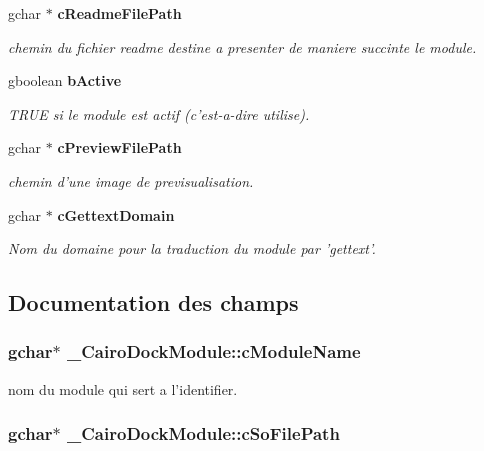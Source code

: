 \begin{CompactItemize}
gchar $\ast$ {\bf cReadmeFilePath}
\begin{CompactList}\small\item\em chemin du fichier readme destine a presenter de maniere succinte le module. \item\end{CompactList}\item 
gboolean {\bf bActive}
\begin{CompactList}\small\item\em TRUE si le module est actif (c'est-a-dire utilise). \item\end{CompactList}\item 
gchar $\ast$ {\bf cPreviewFilePath}
\begin{CompactList}\small\item\em chemin d'une image de previsualisation. \item\end{CompactList}\item 
gchar $\ast$ {\bf cGettextDomain}
\begin{CompactList}\small\item\em Nom du domaine pour la traduction du module par 'gettext'. \item\end{CompactList}\end{CompactItemize}


\subsection{Documentation des champs}
\subsubsection{\setlength{\rightskip}{0pt plus 5cm}gchar$\ast$ {\bf \_\-CairoDockModule::cModuleName}}\label{struct__CairoDockModule_55a35c3c19448cb40a9b852d22627d91}


nom du module qui sert a l'identifier. 

\subsubsection{\setlength{\rightskip}{0pt plus 5cm}gchar$\ast$ {\bf \_\-CairoDockModule::cSoFilePath}}\label{struct__CairoDockModule_c1411c49bcf48d457ee8620b3c46c01f}


